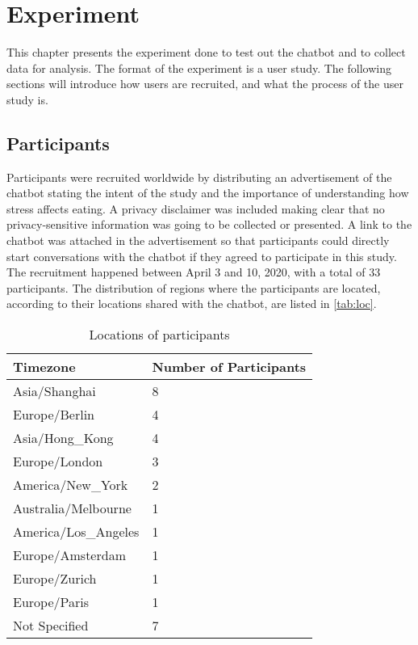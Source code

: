 
\chapter{Experiment}\label{chapter:experiment}
This chapter presents the experiment done to test out the chatbot and to collect data for analysis. The format of the experiment is a user study. The following sections will introduce how users are recruited, and what the process of the user study is.

\section{Participants}
Participants were recruited worldwide by distributing an advertisement of the chatbot stating the intent of the study and the importance of understanding how stress affects eating. A privacy disclaimer was included making clear that no privacy-sensitive information was going to be collected or presented. A link to the chatbot was attached in the advertisement so that participants could directly start conversations with the chatbot if they agreed to participate in this study. The recruitment happened between April 3 and 10, 2020, with a total of 33 participants. The distribution of regions where the participants are located, according to their locations shared with the chatbot, are listed in \autoref{tab:loc}.

\begin{table}[htpb]
  \caption[Locations of Participants]{Locations of participants}\label{tab:loc}
  \centering
  \begin{tabular}{l l}
    \toprule
      Timezone & Number of Participants \\
    \midrule
      Asia/Shanghai & 8 \\
      Europe/Berlin & 4 \\
      Asia/Hong\_Kong & 4 \\
      Europe/London & 3 \\
      America/New\_York & 2 \\
      Australia/Melbourne & 1 \\
      America/Los\_Angeles & 1 \\
      Europe/Amsterdam & 1 \\
      Europe/Zurich & 1 \\
      Europe/Paris & 1 \\
      Not Specified & 7 \\
    \bottomrule
  \end{tabular}
\end{table}

